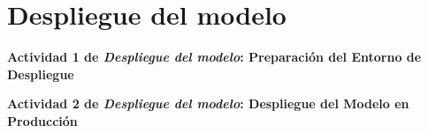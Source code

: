 \section{Despliegue del modelo}
\textbf{Actividad 1 de \textit{Despliegue del modelo}: Preparación del Entorno de Despliegue}

\textbf{Actividad 2 de \textit{Despliegue del modelo}: Despliegue del Modelo en Producción}
